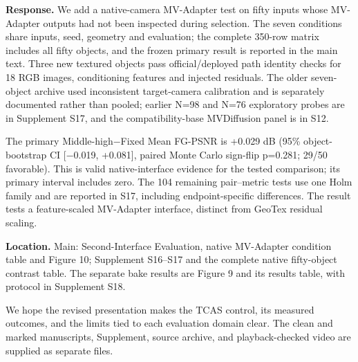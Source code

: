 \documentclass[
  10pt,
]{article}
\begin{document}
\textbf{Response.} We add a native-camera MV-Adapter test on fifty inputs whose MV-Adapter outputs had not been inspected during selection. The seven conditions share inputs, seed, geometry and evaluation; the complete 350-row matrix includes all fifty objects, and the frozen primary result is reported in the main text. Three new textured objects pass official/deployed path identity checks for 18 RGB images, conditioning features and injected residuals. The older seven-object archive used inconsistent target-camera calibration and is separately documented rather than pooled; earlier N=98 and N=76 exploratory probes are in Supplement S17, and the compatibility-base MVDiffusion panel is in S12.

The primary Middle-high−Fixed Mean FG-PSNR is +0.029 dB (95\% object-bootstrap CI {[}−0.019, +0.081{]}, paired Monte Carlo sign-flip p=0.281; 29/50 favorable). This is valid native-interface evidence for the tested comparison; its primary interval includes zero. The 104 remaining pair--metric tests use one Holm family and are reported in S17, including endpoint-specific differences. The result tests a feature-scaled MV-Adapter interface, distinct from GeoTex residual scaling.

\textbf{Location.} Main: Second-Interface Evaluation, native MV-Adapter condition table and Figure 10; Supplement S16--S17 and the complete native fifty-object contrast table. The separate bake results are Figure 9 and its results table, with protocol in Supplement S18.

We hope the revised presentation makes the TCAS control, its measured outcomes, and the limits tied to each evaluation domain clear. The clean and marked manuscripts, Supplement, source archive, and playback-checked video are supplied as separate files.
\end{document}
